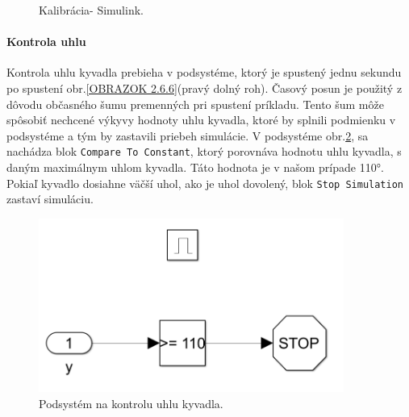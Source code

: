 \begin{figure}[!tbh]
	\hfill
	\hfill
	\hfill
	\caption{Kalibrácia- Simulink.}\label{OBRAZOK 2.6.8}
\end{figure}

\paragraph{Kontrola uhlu}

Kontrola uhlu kyvadla prebieha v podsystéme, ktorý je spustený jednu sekundu po spustení obr.\ref{OBRAZOK 2.6.6}(pravý dolný roh). Časový posun je použitý z dôvodu občasného šumu premenných pri spustení príkladu. Tento šum môže spôsobiť nechcené výkyvy hodnoty uhlu kyvadla, ktoré by splnili podmienku v podsystéme a tým by zastavili priebeh simulácie. V podsystéme obr.\ref{OBRAZOK 2.6.9}, sa nachádza blok \verb|Compare To Constant|, ktorý porovnáva hodnotu uhlu kyvadla, s daným maximálnym uhlom kyvadla. Táto hodnota je v našom prípade 110°. Pokiaľ kyvadlo dosiahne väčší uhol, ako je uhol dovolený, blok \verb|Stop Simulation| zastaví simuláciu.  

\begin{figure}[!tbh]
	\centering
	\includegraphics[width=100mm]{obr/AngleControl.png}
	\caption{Podsystém na kontrolu uhlu kyvadla.}\label{OBRAZOK 2.6.9}
\end{figure}


